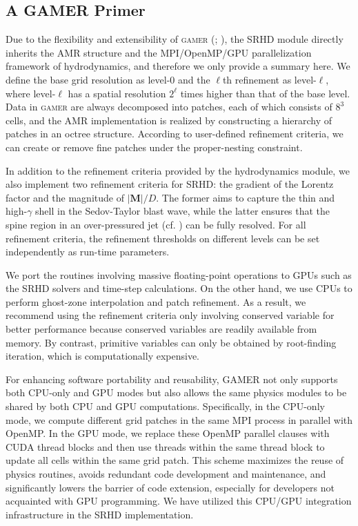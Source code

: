 \documentclass[twocolumn]{aastex63}
\begin{document}
\subsection{A GAMER Primer}
Due to the flexibility and extensibility of \textsc{gamer} (\citealt{gamer-1}; \citealt{gamer-2}), the SRHD module directly inherits the AMR structure and the MPI/OpenMP/GPU parallelization framework of hydrodynamics, and therefore we only provide a summary here. We define the base grid resolution as level-0 and the $\ell$th refinement as level-$\ell$, where level-$\ell$ has a spatial resolution $2^{\ell}$ times higher than that of the base level. Data in \textsc{gamer} are always decomposed into patches, each of which consists of $8^3$ cells, and the AMR implementation is realized by constructing a hierarchy of patches in an octree structure. According to user-defined refinement criteria, we can create or remove fine patches under the proper-nesting constraint.

In addition to the refinement criteria provided by the hydrodynamics module, we also implement two refinement criteria for SRHD: the gradient of the Lorentz factor and the magnitude of $|\mathbf{M}|/D$. The former aims to capture the thin and high-$\gamma$ shell in the Sedov-Taylor blast wave, while the latter ensures that the spine region in an over-pressured jet (cf. ) can be fully resolved. For all refinement criteria, the refinement thresholds on different levels can be set independently as run-time parameters.

We port the routines involving massive floating-point operations to GPUs such as the SRHD solvers and time-step calculations. On the other hand, we use CPUs to perform ghost-zone interpolation and patch refinement. As a result, we recommend using the refinement criteria only involving conserved variable for better performance because conserved variables are readily available from memory. By contrast, primitive variables can only be obtained by root-finding iteration, which is computationally expensive.

For enhancing software portability and reusability, GAMER not only supports both CPU-only and GPU modes but also allows the same physics modules to be shared by both CPU and GPU computations. Specifically, in the CPU-only mode, we compute different grid patches in the same MPI process in parallel with OpenMP. In the GPU mode, we replace these OpenMP parallel clauses with CUDA thread blocks and then use threads within the same thread block to update all cells within the same grid patch. This scheme maximizes the reuse of physics routines, avoids redundant code development and maintenance, and significantly lowers the barrier of code extension, especially for developers not acquainted with GPU programming. We have utilized this CPU/GPU integration infrastructure in the SRHD implementation.
\end{document}
